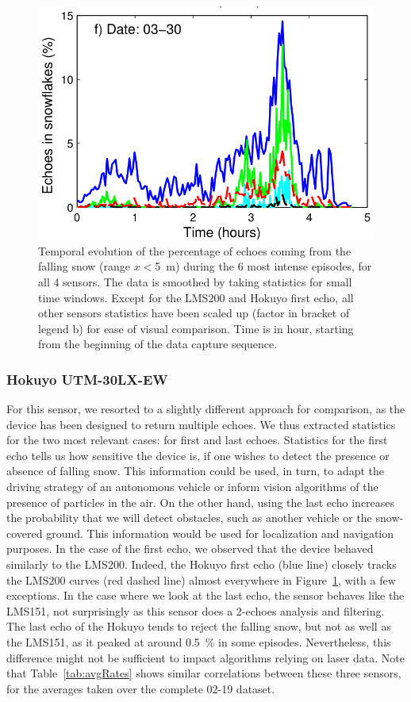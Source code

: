 \begin{figure}
    \includegraphics[width=0.45\linewidth]{./img/chap_lidar/timings_cropped_f.png}
    \caption[Temporal evolution of the percentage of echoes coming from the falling snow within \SI{5}{\meter} of the sensors during the 6 most intense snowfall episodes.]{Temporal evolution of the percentage of echoes coming from the falling snow (range $x<$\SI{5}{\meter}) during the 6 most intense episodes, for all 4 sensors. The data is smoothed by taking statistics for small time windows. Except for the LMS200 and Hokuyo first echo, all other sensors statistics have been scaled up (factor in bracket of legend b) for ease of visual comparison. Time is in hour, starting from the beginning of the data capture sequence.}
    \label{fig:TimingSnow}
\end{figure}


\subsubsection{Hokuyo UTM-30LX-EW}
For this sensor, we resorted to a slightly different approach for comparison, as the device has been designed to return multiple echoes. We thus extracted statistics for the two most relevant cases: for first and last echoes. Statistics for the first echo tells us how sensitive the device is, if one wishes to detect the presence or absence of falling snow. This information could be used, in turn, to adapt the driving strategy of an autonomous vehicle or inform vision algorithms of the presence of particles in the air. On the other hand, using the last echo increases the probability that we will detect obstacles, such as another vehicle or the snow-covered ground. This information would be used for localization and navigation purposes. In the case of the first echo, we observed that the device behaved similarly to the LMS200. Indeed, the Hokuyo first echo (blue line) closely tracks the LMS200 curves (red dashed line) almost everywhere in Figure~\ref{fig:TimingSnow}, with a few exceptions.  In the case where we look at the last echo, the sensor behaves like the LMS151, not surprisingly as this sensor does a 2-echoes analysis and filtering. The last echo of the Hokuyo tends to reject the falling snow, but not as well as the LMS151, as it peaked at around 0.5~\% in some episodes. Nevertheless, this difference might not be sufficient to impact algorithms relying on laser data. Note that Table~\ref{tab:avgRates} shows similar correlations between these three sensors, for the averages taken over the complete 02-19 dataset.


